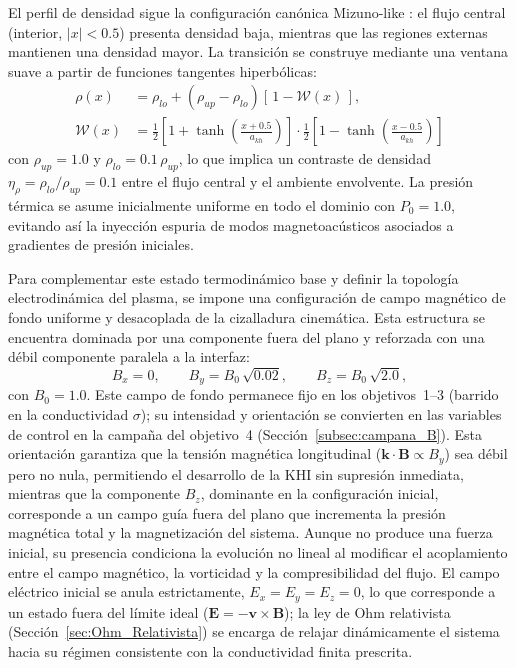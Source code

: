 El perfil de densidad sigue la configuración canónica Mizuno-like \parencite{mizuno-2013}: el flujo central (interior, $|x|<0.5$) presenta densidad baja, mientras que las regiones externas mantienen una densidad mayor. La transición se construye mediante una ventana suave a partir de funciones tangentes hiperbólicas:
\begin{equation}
\begin{aligned}
    \rho(x) &= \rho_{lo} + (\rho_{up} - \rho_{lo})\left[\,1 - \mathcal{W}(x)\,\right],\\[2pt]
    \mathcal{W}(x) &= \tfrac{1}{2}\!\left[1 + \tanh\!\left(\tfrac{x+0.5}{a_{kh}}\right)\right]\!\cdot\!\tfrac{1}{2}\!\left[1 - \tanh\!\left(\tfrac{x-0.5}{a_{kh}}\right)\right]
\end{aligned}
    \label{eq:rho_profile}
\end{equation}
con $\rho_{up} = 1.0$ y $\rho_{lo} = 0.1\,\rho_{up}$, lo que implica un contraste de densidad $\eta_\rho = \rho_{lo}/\rho_{up} = 0.1$ entre el flujo central y el ambiente envolvente. La presión térmica se asume inicialmente uniforme en todo el dominio con $P_0 = 1.0$, evitando así la inyección espuria de modos magnetoacústicos asociados a gradientes de presión iniciales.

Para complementar este estado termodinámico base y definir la topología electrodinámica del plasma, se impone una configuración de campo magnético de fondo uniforme y desacoplada de la cizalladura cinemática. Esta estructura se encuentra dominada por una componente fuera del plano y reforzada con una débil componente paralela a la interfaz:
\begin{equation}
    B_x = 0,\qquad B_y = B_0\,\sqrt{0.02},\qquad B_z = B_0\,\sqrt{2.0},
    \label{eq:B_field_init}
\end{equation}
con $B_0 = 1.0$. Este campo de fondo permanece fijo en los objetivos~1--3 (barrido en la conductividad $\sigma$); su intensidad y orientación se convierten en las variables de control en la campaña del objetivo~4 (Sección~\ref{subsec:campana_B}). Esta orientación garantiza que la tensión magnética longitudinal ($\mathbf{k}\cdot\mathbf{B}\propto B_y$) sea débil pero no nula, permitiendo el desarrollo de la KHI sin supresión inmediata, mientras que la componente $B_z$, dominante en la configuración inicial, corresponde a un campo guía fuera del plano que incrementa la presión magnética total y la magnetización del sistema. Aunque no produce una fuerza inicial, su presencia condiciona la evolución no lineal al modificar el acoplamiento entre el campo magnético, la vorticidad y la compresibilidad del flujo. El campo eléctrico inicial se anula estrictamente, $E_x = E_y = E_z = 0$, lo que corresponde a un estado fuera del límite ideal ($\mathbf{E} = -\mathbf{v}\times\mathbf{B}$); la ley de Ohm relativista (Sección~\ref{sec:Ohm_Relativista}) se encarga de relajar dinámicamente el sistema hacia su régimen consistente con la conductividad finita prescrita.

